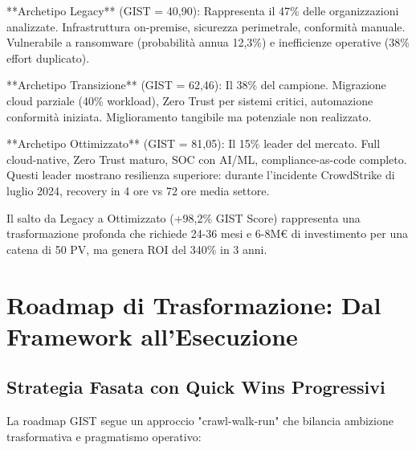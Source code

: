 **Archetipo Legacy** (GIST = 40,90): Rappresenta il 47\% delle organizzazioni analizzate. Infrastruttura on-premise, sicurezza perimetrale, conformità manuale. Vulnerabile a ransomware (probabilità annua 12,3\%) e inefficienze operative (38\% effort duplicato).

**Archetipo Transizione** (GIST = 62,46): Il 38\% del campione. Migrazione cloud parziale (40\% workload), Zero Trust per sistemi critici, automazione conformità iniziata. Miglioramento tangibile ma potenziale non realizzato.

**Archetipo Ottimizzato** (GIST = 81,05): Il 15\% leader del mercato. Full cloud-native, Zero Trust maturo, SOC con AI/ML, compliance-as-code completo. Questi leader mostrano resilienza superiore: durante l'incidente CrowdStrike di luglio 2024, recovery in 4 ore vs 72 ore media settore.

Il salto da Legacy a Ottimizzato (+98,2\% GIST Score) rappresenta una trasformazione profonda che richiede 24-36 mesi e 6-8M€ di investimento per una catena di 50 PV, ma genera ROI del 340\% in 3 anni.

\section{\texorpdfstring{Roadmap di Trasformazione: Dal Framework all'Esecuzione}{5.4 - Roadmap di Trasformazione}}
\label{sec:5.4}

\subsection{\texorpdfstring{Strategia Fasata con Quick Wins Progressivi}{5.4.1 - Strategia Fasata}}
\label{subsec:5.4.1}

La roadmap GIST segue un approccio "crawl-walk-run" che bilancia ambizione trasformativa e pragmatismo operativo:

